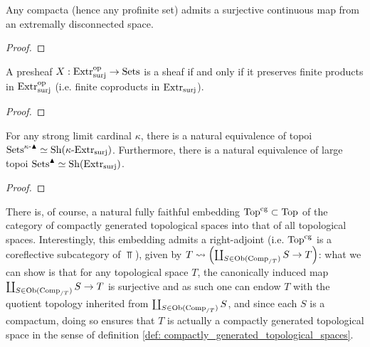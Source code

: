             \begin{lemma} \label{lemma: surjections_from_extremally_disconnected_spaces_to_compacta}
                Any compacta (hence any profinite set) admits a surjective continuous map from an extremally disconnected space.
            \end{lemma}
                \begin{proof}
                    
                \end{proof}
            \begin{corollary} \label{coro: simplified_sheaf_condition_for_extremally_disconnected_spaces}
                A presheaf $X: \mathrm{Extr}_{\mathrm{surj}}^{\mathrm{op}} \to \mathrm{Sets}$ is a sheaf if and only if it preserves finite products in $\mathrm{Extr}_{\mathrm{surj}}^{\mathrm{op}}$ (i.e. finite coproducts in $\mathrm{Extr}_{\mathrm{surj}}$).
            \end{corollary}
                \begin{proof}
                    
                \end{proof}
            \begin{proposition} \label{prop: condensed_sets_are_sheaves_on_extremally_disconnected_spaces}
                For any strong limit cardinal $\kappa$, there is a natural equivalence of topoi $\mathrm{Sets}^{\kappa\text{-}\blacktriangle} \simeq \mathrm{Sh}(\kappa\text{-}\mathrm{Extr}_{\mathrm{surj}})$. Furthermore, there is a natural equivalence of large topoi $\mathrm{Sets}^{\blacktriangle} \simeq \mathrm{Sh}(\mathrm{Extr}_{\mathrm{surj}})$.
            \end{proposition}
                \begin{proof}
                    
                \end{proof}
            \begin{remark}
                There is, of course, a natural fully faithful embedding $\mathrm{Top}^{\mathrm{cg}} \subset \mathrm{Top}$ of the category of compactly generated topological spaces into that of all topological spaces. Interestingly, this embedding admits a right-adjoint (i.e. $\mathrm{Top}^{\mathrm{cg}}$ is a coreflective subcategory of $\Top$), given by $T \leadsto \left(\coprod_{S \in \mathrm{Ob}(\mathrm{Comp}_{/T})} S \to T\right)$: what we can show is that for any topological space $T$, the canonically induced map $\coprod_{S \in \mathrm{Ob}(\mathrm{Comp}_{/T})} S \to T$ is surjective and as such one can endow $T$ with the quotient topology inherited from $\coprod_{S \in \mathrm{Ob}(\mathrm{Comp}_{/T})} S$, and since each $S$ is a compactum, doing so ensures that $T$ is actually a compactly generated topological space in the sense of definition \ref{def: compactly_generated_topological_spaces}. 
            \end{remark}
